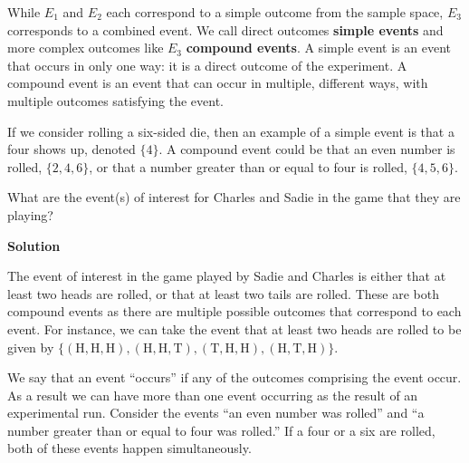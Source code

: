 \documentclass[
  letterpaper,
  DIV=11,
  numbers=noendperiod]{scrreprt}
\begin{document}
While \(E_1\) and \(E_2\) each correspond to a simple outcome from the
sample space, \(E_3\) corresponds to a combined event. We call direct
outcomes \textbf{simple events} and more complex outcomes like \(E_3\)
\textbf{compound events}. A simple event is an event that occurs in only
one way: it is a direct outcome of the experiment. A compound event is
an event that can occur in multiple, different ways, with multiple
outcomes satisfying the event.

If we consider rolling a six-sided die, then an example of a simple
event is that a four shows up, denoted \(\{4\}\). A compound event could
be that an even number is rolled, \(\{2,4,6\}\), or that a number
greater than or equal to four is rolled, \(\{4, 5, 6\}\).

\begin{tcolorbox}[enhanced jigsaw, toptitle=1mm, arc=.35mm, title={{\faIcon{question-circle}} Example: Specifying Events}, opacitybacktitle=0.6, colbacktitle=quarto-callout-tip-color!10!white, coltitle=black, breakable, bottomrule=.15mm, opacityback=0, colframe=quarto-callout-tip-color-frame, bottomtitle=1mm, titlerule=0mm, rightrule=.15mm, toprule=.15mm, left=2mm, leftrule=.75mm, colback=white]

{What are the event(s) of interest for Charles and Sadie in the game
that they are playing?}

\begin{tcolorbox}[enhanced jigsaw, toprule=.15mm, breakable, bottomrule=.15mm, arc=.35mm, opacityback=0, colback=white, rightrule=.15mm, left=2mm, leftrule=.75mm]

\vspace{-3mm}\textbf{Solution}\vspace{3mm}

The event of interest in the game played by Sadie and Charles is either
that at least two heads are rolled, or that at least two tails are
rolled. These are both compound events as there are multiple possible
outcomes that correspond to each event. For instance, we can take the
event that at least two heads are rolled to be given by
\(\{(\text{H},\text{H},\text{H}),(\text{H},\text{H},\text{T}), (\text{T},\text{H},\text{H}), (\text{H},\text{T},\text{H})\}\).

\end{tcolorbox}

\end{tcolorbox}

We say that an event ``occurs'' if any of the outcomes comprising the
event occur. As a result we can have more than one event occurring as
the result of an experimental run. Consider the events ``an even number
was rolled'' and ``a number greater than or equal to four was rolled.''
If a four or a six are rolled, both of these events happen
simultaneously.
\end{document}
